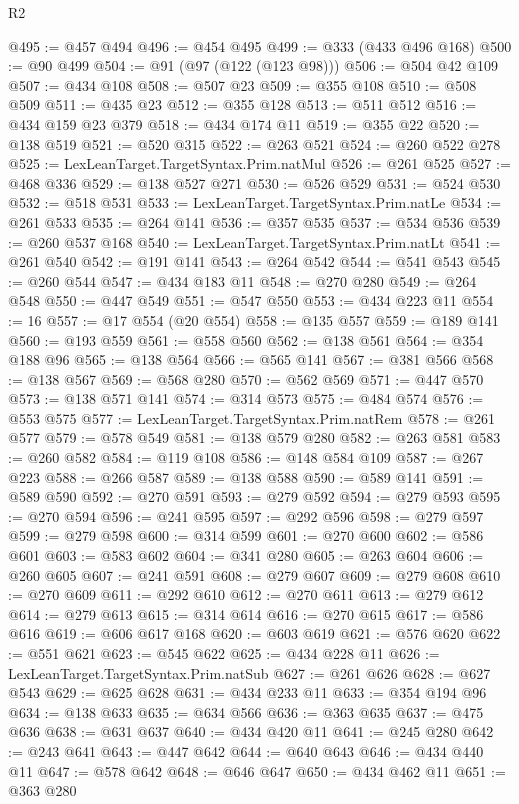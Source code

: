 \begin{lexlean}{R2}
\begin{coremodule}
@495 := @457 @494
@496 := @454 @495
@499 := @333 (@433 @496 @168)
@500 := @90 @499
@504 := @91 (@97 (@122 (@123 @98)))
@506 := @504 @42 @109
@507 := @434 @108
@508 := @507 @23
@509 := @355 @108
@510 := @508 @509
@511 := @435 @23
@512 := @355 @128
@513 := @511 @512
@516 := @434 @159 @23 @379
@518 := @434 @174 @11
@519 := @355 @22
@520 := @138 @519
@521 := @520 @315
@522 := @263 @521
@524 := @260 @522 @278
@525 := LexLeanTarget.TargetSyntax.Prim.natMul
@526 := @261 @525
@527 := @468 @336
@529 := @138 @527 @271
@530 := @526 @529
@531 := @524 @530
@532 := @518 @531
@533 := LexLeanTarget.TargetSyntax.Prim.natLe
@534 := @261 @533
@535 := @264 @141
@536 := @357 @535
@537 := @534 @536
@539 := @260 @537 @168
@540 := LexLeanTarget.TargetSyntax.Prim.natLt
@541 := @261 @540
@542 := @191 @141
@543 := @264 @542
@544 := @541 @543
@545 := @260 @544
@547 := @434 @183 @11
@548 := @270 @280
@549 := @264 @548
@550 := @447 @549
@551 := @547 @550
@553 := @434 @223 @11
@554 := 16
@557 := @17 @554 (@20 @554)
@558 := @135 @557
@559 := @189 @141
@560 := @193 @559
@561 := @558 @560
@562 := @138 @561
@564 := @354 @188 @96
@565 := @138 @564
@566 := @565 @141
@567 := @381 @566
@568 := @138 @567
@569 := @568 @280
@570 := @562 @569
@571 := @447 @570
@573 := @138 @571 @141
@574 := @314 @573
@575 := @484 @574
@576 := @553 @575
@577 := LexLeanTarget.TargetSyntax.Prim.natRem
@578 := @261 @577
@579 := @578 @549
@581 := @138 @579 @280
@582 := @263 @581
@583 := @260 @582
@584 := @119 @108
@586 := @148 @584 @109
@587 := @267 @223
@588 := @266 @587
@589 := @138 @588
@590 := @589 @141
@591 := @589 @590
@592 := @270 @591
@593 := @279 @592
@594 := @279 @593
@595 := @270 @594
@596 := @241 @595
@597 := @292 @596
@598 := @279 @597
@599 := @279 @598
@600 := @314 @599
@601 := @270 @600
@602 := @586 @601
@603 := @583 @602
@604 := @341 @280
@605 := @263 @604
@606 := @260 @605
@607 := @241 @591
@608 := @279 @607
@609 := @279 @608
@610 := @270 @609
@611 := @292 @610
@612 := @270 @611
@613 := @279 @612
@614 := @279 @613
@615 := @314 @614
@616 := @270 @615
@617 := @586 @616
@619 := @606 @617 @168
@620 := @603 @619
@621 := @576 @620
@622 := @551 @621
@623 := @545 @622
@625 := @434 @228 @11
@626 := LexLeanTarget.TargetSyntax.Prim.natSub
@627 := @261 @626
@628 := @627 @543
@629 := @625 @628
@631 := @434 @233 @11
@633 := @354 @194 @96
@634 := @138 @633
@635 := @634 @566
@636 := @363 @635
@637 := @475 @636
@638 := @631 @637
@640 := @434 @420 @11
@641 := @245 @280
@642 := @243 @641
@643 := @447 @642
@644 := @640 @643
@646 := @434 @440 @11
@647 := @578 @642
@648 := @646 @647
@650 := @434 @462 @11
@651 := @363 @280

\end{coremodule}
\end{lexlean}
